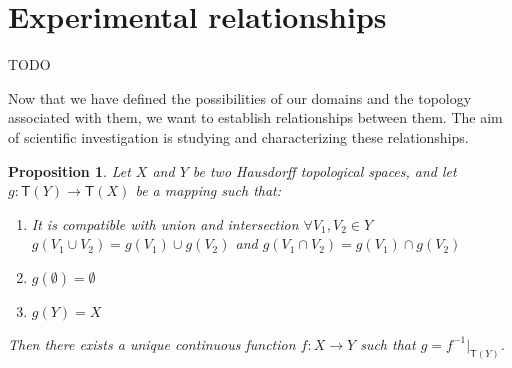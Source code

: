 \documentclass[review]{elsarticle}
\theoremstyle{plain}%
\newtheorem{prop}[thm]{Proposition}
\theoremstyle{definition}
\theoremstyle{remark}
\begin{document}
\section{Experimental relationships}

TODO

Now that we have defined the possibilities of our domains and the topology associated with them, we want to establish relationships between them. The aim of scientific investigation is studying and characterizing these relationships. 



\begin{prop}
	\label{setfunctions}
	Let $X$ and $Y$ be two Hausdorff topological spaces, and let $g: \mathsf{T}(Y) \rightarrow \mathsf{T}(X)$ be a mapping such that:
	\begin{enumerate}
		\item It is compatible with union and intersection $\forall V_1, V_2 \in Y$ $g(V_1 \cup V_2)=g(V_1)\cup g(V_2)$ and $g(V_1 \cap V_2)=g(V_1)\cap g(V_2)$
		\item $g(\emptyset) = \emptyset$
		\item $g(Y) = X$
	\end{enumerate}
	Then there exists a unique continuous function $f: X \rightarrow Y$ such that $g = f^{-1} |_{\mathsf{T}(Y)}$.
\end{prop}
\end{document}
